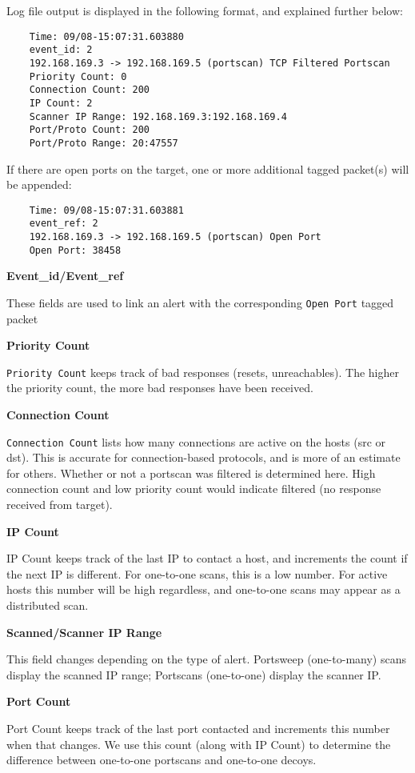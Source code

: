 \documentclass[english]{report}
\newcounter{slistnum}
\newenvironment{slist}
{ \begin{list}{ {\bf \arabic{slistnum}.} }{\usecounter{slistnum} } }
{ \end{list} }
\begin{document}
Log file output is displayed in the following format, and explained further
below:

\begin{verbatim}
	Time: 09/08-15:07:31.603880
	event_id: 2
	192.168.169.3 -> 192.168.169.5 (portscan) TCP Filtered Portscan
	Priority Count: 0
	Connection Count: 200
	IP Count: 2
	Scanner IP Range: 192.168.169.3:192.168.169.4
	Port/Proto Count: 200
	Port/Proto Range: 20:47557
\end{verbatim}

If there are open ports on the target, one or more additional tagged packet(s)
will be appended:

\begin{verbatim}
	Time: 09/08-15:07:31.603881
	event_ref: 2
	192.168.169.3 -> 192.168.169.5 (portscan) Open Port
	Open Port: 38458
\end{verbatim}

\begin{slist}
  \item \textbf{Event\_id/Event\_ref}

     These fields are used to link an alert with the corresponding 
     \texttt{Open Port} tagged packet

  \item \textbf{Priority Count}

     \texttt{Priority Count} keeps track of bad responses (resets,
     unreachables). The higher the priority count, the more bad
     responses have been received.

  \item \textbf{Connection Count}
     
     \texttt{Connection Count} lists how many connections are active on the
     hosts (src or dst). This is accurate for connection-based
     protocols, and is more of an estimate for others. Whether or not a
     portscan was filtered is determined here. High connection count and
     low priority count would indicate filtered (no response received
     from target).

  \item \textbf{IP Count}

     IP Count keeps track of the last IP to contact a host, and
     increments the count if the next IP is different. For one-to-one
     scans, this is a low number. For active hosts this number will
     be high regardless, and one-to-one scans may appear as a
     distributed scan.

  \item \textbf{Scanned/Scanner IP Range}

     This field changes depending on the type of alert. Portsweep
     (one-to-many) scans display the scanned IP range; Portscans
     (one-to-one) display the scanner IP. 

 \item \textbf{Port Count}

     Port Count keeps track of the last port contacted and increments
     this number when that changes. We use this count (along with IP
     Count) to determine the difference between one-to-one portscans
     and one-to-one decoys.
\end{slist}
\end{document}
